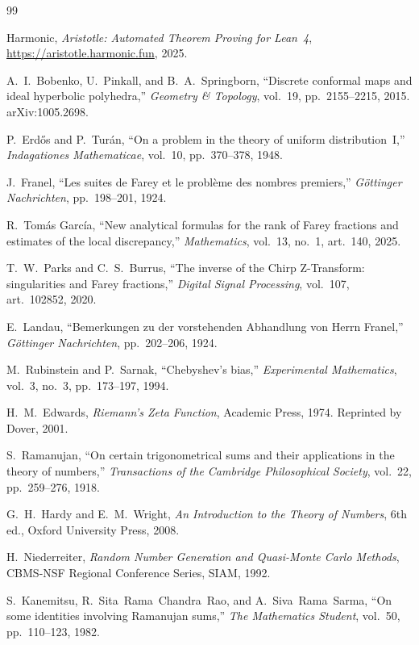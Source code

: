\documentclass[11pt]{article}
\theoremstyle{definition}
\begin{document}
\begin{thebibliography}{99}

Harmonic,
\emph{Aristotle: Automated Theorem Proving for Lean~4},
\url{https://aristotle.harmonic.fun}, 2025.

A.~I.~Bobenko, U.~Pinkall, and B.~A.~Springborn,
``Discrete conformal maps and ideal hyperbolic polyhedra,''
\emph{Geometry \& Topology}, vol.~19, pp.~2155--2215, 2015.
arXiv:1005.2698.

P.~Erd\H{o}s and P.~Tur\'an,
``On a problem in the theory of uniform distribution~I,''
\emph{Indagationes Mathematicae}, vol.~10, pp.~370--378, 1948.

J.~Franel,
``Les suites de Farey et le probl\`eme des nombres premiers,''
\emph{G\"ottinger Nachrichten}, pp.~198--201, 1924.

R.~Tom\'as Garc\'ia,
``New analytical formulas for the rank of Farey fractions
and estimates of the local discrepancy,''
\emph{Mathematics}, vol.~13, no.~1, art.~140, 2025.

T.~W.~Parks and C.~S.~Burrus,
``The inverse of the Chirp Z-Transform: singularities and
Farey fractions,''
\emph{Digital Signal Processing}, vol.~107, art.~102852, 2020.

E.~Landau,
``Bemerkungen zu der vorstehenden Abhandlung von Herrn Franel,''
\emph{G\"ottinger Nachrichten}, pp.~202--206, 1924.

M.~Rubinstein and P.~Sarnak,
``Chebyshev's bias,''
\emph{Experimental Mathematics}, vol.~3, no.~3, pp.~173--197, 1994.


H.~M.~Edwards,
\emph{Riemann's Zeta Function},
Academic Press, 1974.
Reprinted by Dover, 2001.

S.~Ramanujan,
``On certain trigonometrical sums and their applications in the
theory of numbers,''
\emph{Transactions of the Cambridge Philosophical Society},
vol.~22, pp.~259--276, 1918.

G.~H.~Hardy and E.~M.~Wright,
\emph{An Introduction to the Theory of Numbers}, 6th ed.,
Oxford University Press, 2008.

H.~Niederreiter,
\emph{Random Number Generation and Quasi-Monte Carlo Methods},
CBMS-NSF Regional Conference Series, SIAM, 1992.

S.~Kanemitsu, R.~Sita~Rama~Chandra~Rao, and A.~Siva~Rama~Sarma,
``On some identities involving Ramanujan sums,''
\emph{The Mathematics Student}, vol.~50, pp.~110--123, 1982.


\end{thebibliography}
\end{document}
